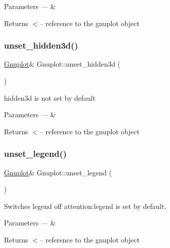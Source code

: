 \begin{DoxyParams}{Parameters}
{\em ---} & \\
\hline
\end{DoxyParams}
\begin{DoxyReturn}{Returns}
$<$-- reference to the gnuplot object 
\end{DoxyReturn}
\mbox{\label{classGnuplot_ab8688182047f746090e1e5f2a8c11c9e}} 
\subsubsection{\texorpdfstring{unset\+\_\+hidden3d()}{unset\_hidden3d()}}
{\footnotesize\ttfamily \hyperlink{classGnuplot}{Gnuplot}\& Gnuplot\+::unset\+\_\+hidden3d (\begin{DoxyParamCaption}{ }\end{DoxyParamCaption})\hspace{0.3cm}{\ttfamily [inline]}}

hidden3d is not set by default


\begin{DoxyParams}{Parameters}
{\em ---} & \\
\hline
\end{DoxyParams}
\begin{DoxyReturn}{Returns}
$<$-- reference to the gnuplot object 
\end{DoxyReturn}
\mbox{\label{classGnuplot_ace901a18ab1a459213afd3ee0233b5ce}} 
\subsubsection{\texorpdfstring{unset\+\_\+legend()}{unset\_legend()}}
{\footnotesize\ttfamily \hyperlink{classGnuplot}{Gnuplot}\& Gnuplot\+::unset\+\_\+legend (\begin{DoxyParamCaption}{ }\end{DoxyParamCaption})\hspace{0.3cm}{\ttfamily [inline]}}



Switches legend off attention\+:legend is set by default. 


\begin{DoxyParams}{Parameters}
{\em ---} & \\
\hline
\end{DoxyParams}
\begin{DoxyReturn}{Returns}
$<$-- reference to the gnuplot object 
\end{DoxyReturn}
\mbox{\label{classGnuplot_aad76cdec16cfb5fdf82f45ed2786f4d8}} 
